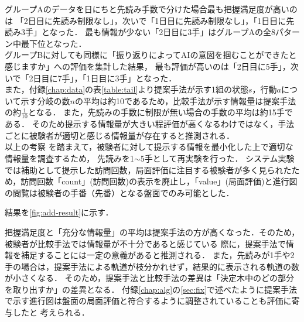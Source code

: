 グループAのデータを日にちと先読み手数で分けた場合最も把握満足度が高いのは
「2日目に先読み制限なし」，次いで「1日目に先読み制限なし」，「1日目に先読み3手」となった．
最も情報が少ない「2日目に3手」はグループAの全8パターン中最下位となった．\\


グループBに対しても同様に「振り返りによってAIの意図を掴むことができたと感じますか」への評価を集計した結果，
最も評価が高いのは「2日目に5手」，次いで「2日目に7手」，「1日目に3手」となった．\\



また，付録\ref{chap:data}の表\ref{table:tail}より提案手法が示す1組の状態$s$，行動$a$について示す分岐の数$n$の平均は約10であるため，比較手法が示す情報量は提案手法の約$\frac{1}{10}$となる．
また，先読みの手数に制限が無い場合の手数の平均は約15手である．
そのため提示する情報量が大きい程評価が高くなるわけではなく，手法ごとに被験者が適切と感じる情報量が存在すると推測される．\\

以上の考察
を踏まえて，被験者に対して提示する情報を最小化した上で適切な情報量を調査するため，
先読みを1$\sim$5手として再実験を行った．
システム実験では補助として提示した訪問回数，局面評価に注目する被験者が多く見られたため，訪問回数「count」(訪問回数)の表示を廃止し，「value」(局面評価)と進行図の閲覧は被験者の手番（先番）となる盤面でのみ可能とした．

結果を\ref{fig:add-result}に示す．

\begin{table}[H]
    \caption{先読み手数制限なしの場合}
    \scriptsize
    \centering
    \label{table:add-result}
\end{table}


把握満足度と「充分な情報量」の平均は提案手法の方が高くなった．そのため，被験者が比較手法では情報量が不十分であると感じている
際に，提案手法で情報を補足することには一定の意義があると推測される．
また，先読みが1手や2手の場合は，提案手法による軌道が枝分かれせず，結果的に表示される軌道の数が小さくなる．
そのため，提案手法と比較手法の差異は「決定木中のどの部分を取り出すか」の差異となる．
付録\ref{chap:alg}の\ref{sec:fix}で述べたように提案手法で示す進行図は盤面の局面評価と符合するように調整されていることも評価に寄与したと
考えられる．